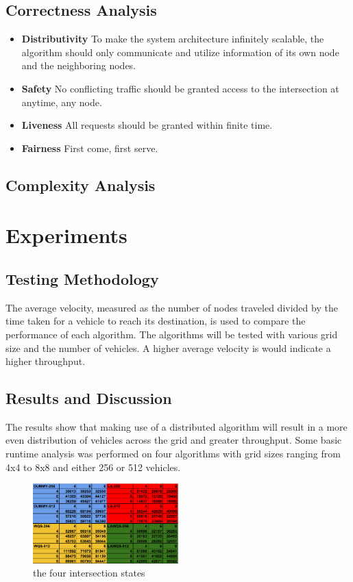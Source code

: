 \documentclass[conference]{IEEEtran}
\begin{document}
\subsection{Correctness Analysis}

\begin{itemize}
\item {\bf Distributivity} To make the system architecture infinitely scalable, the algorithm should only communicate and utilize information of its own node and the neighboring nodes.
\item {\bf Safety} No conflicting traffic should be granted access to the intersection at anytime, any node.
\item {\bf Liveness} All requests should be granted within finite time.
\item {\bf Fairness} First come, first serve.
\end{itemize}

\subsection{ Complexity Analysis}


\section{Experiments}
\subsection{Testing Methodology}
The average velocity, measured as the number of nodes traveled divided by the time taken for a vehicle to reach its destination, is used to compare the performance of each algorithm. The algorithms will be tested with various grid size and the number of vehicles. A higher average velocity is would indicate a higher throughput.

\subsection{Results and Discussion}
The results show that making use of a distributed algorithm will result in a more even distribution of vehicles across the grid and greater throughput. Some basic runtime analysis was performed on four algorithms with grid sizes ranging from 4x4 to 8x8 and either 256 or 512 vehicles.

\begin{figure}[h]
    \center    
    \includegraphics[width=0.5\textwidth]{images/simulation_duration.png}
	\caption{the four intersection states}
	\label{intersection_states}
\end{figure}
\end{document}
